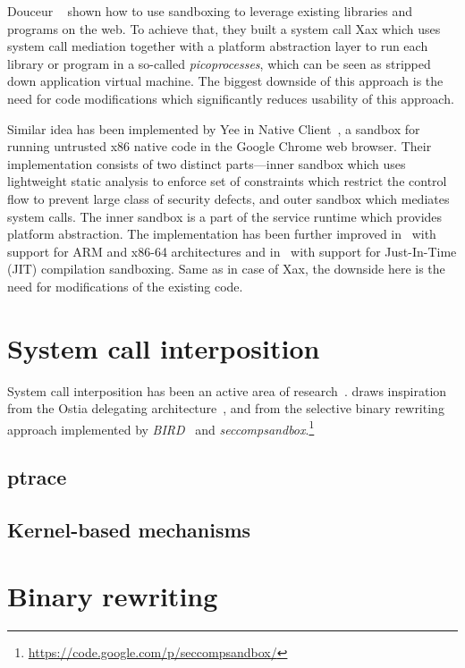 Douceur \etal~\cite{douceur08} shown how to use sandboxing to leverage existing
libraries and programs on the web. To achieve that, they built a system call
Xax which uses system call mediation together with a platform abstraction layer
to run each library or program in a so-called \emph{picoprocesses}, which can
be seen as stripped down application virtual machine. The biggest downside of
this approach is the need for code modifications which significantly reduces
usability of this approach.

Similar idea has been implemented by Yee \etal in Native Client~\cite{nacl}, a
sandbox for running untrusted x86 native code in the Google Chrome web browser.
Their implementation consists of two distinct parts---inner sandbox which uses
lightweight static analysis to enforce set of constraints which restrict the
control flow to prevent large class of security defects, and outer sandbox
which mediates system calls. The inner sandbox is a part of the service runtime
which provides platform abstraction. The implementation has been further
improved in~\cite{nacl-cpu} with support for ARM and x86-64 architectures and
in~\cite{nacl-jit} with support for Just-In-Time (JIT) compilation sandboxing.
Same as in case of Xax, the downside here is the need for modifications of the
existing code.

\section{System call interposition}

System call interposition has been an active area of
research~\cite{jain1999,provos2002,janus}.  \nx draws inspiration from the
Ostia delegating architecture~\cite{ostia}, and from the selective binary
rewriting approach implemented by \emph{BIRD}~\cite{bird} and
\emph{seccompsandbox}.\footnote{\url{https://code.google.com/p/seccompsandbox/}}

\subsection{ptrace}

\subsection{Kernel-based mechanisms}

\section{Binary rewriting}


